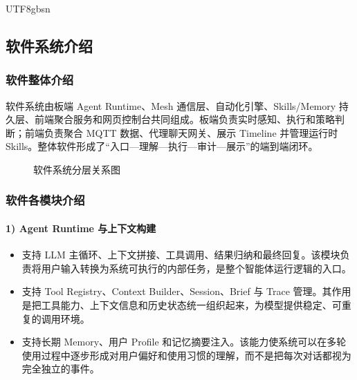 \documentclass[a4paper,12pt]{article}
\begin{document}
\begin{CJK*}{UTF8}{gbsn}
\subsection{软件系统介绍}

\subsubsection{软件整体介绍}
软件系统由板端 Agent Runtime、Mesh 通信层、自动化引擎、Skills/Memory 持久层、前端聚合服务和网页控制台共同组成。板端负责实时感知、执行和策略判断；前端负责聚合 MQTT 数据、代理聊天网关、展示 Timeline 并管理运行时 Skills。整体软件形成了“入口---理解---执行---审计---展示”的端到端闭环。

\begin{figure}[htbp]
\centering
{}
\caption{软件系统分层关系图}
\end{figure}

\subsubsection{软件各模块介绍}

\paragraph{1) Agent Runtime 与上下文构建}
\begin{itemize}
  \item 支持 LLM 主循环、上下文拼接、工具调用、结果归纳和最终回复。该模块负责将用户输入转换为系统可执行的内部任务，是整个智能体运行逻辑的入口。
  \item 支持 Tool Registry、Context Builder、Session、Brief 与 Trace 管理。其作用是把工具能力、上下文信息和历史状态统一组织起来，为模型提供稳定、可重复的调用环境。
  \item 支持长期 Memory、用户 Profile 和记忆摘要注入。该能力使系统可以在多轮使用过程中逐步形成对用户偏好和使用习惯的理解，而不是把每次对话都视为完全独立的事件。
\end{itemize}


\end{CJK*}
\end{document}
